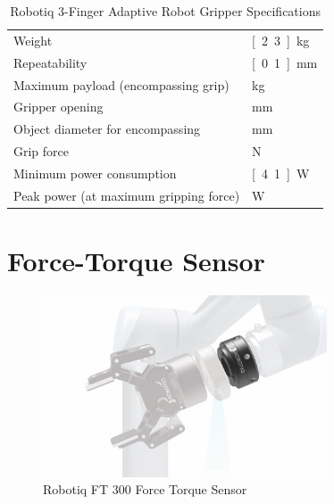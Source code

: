 \begin{table}[h]
\begin{center}
 \caption{Robotiq 3-Finger Adaptive Robot Gripper Specifications}\vspace{1ex}
 \label{tab:robotiq_gripper}
 \begin{tabular}{ll}
 \hline
 Weight & \unit[2.3]{kg}\\
 Repeatability & \unit[0.1]{mm} \\
 Maximum payload (encompassing grip) & \unit[10]{kg}\\
 Gripper opening & \unit[0 to 155]{mm} \\
 Object diameter for encompassing & \unit[20 to 155]{mm}\\
 Grip force & \unit[30 to 70]{N} \\
 Minimum power consumption & \unit[4.1]{W} \\
 Peak power (at maximum gripping force) & \unit[36]{W}\\
 \hline
 \end{tabular}
\end{center}
\end{table}

\section{Force-Torque Sensor}

\begin{figure}
   \centering
   \includegraphics[width=0.75\textwidth]{images/robotiq_ft.jpg}
   \caption{Robotiq FT 300 Force Torque Sensor}
   \label{pics:robotiq_ft}
\end{figure}

